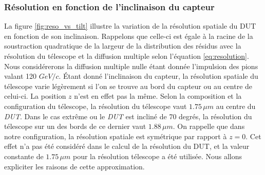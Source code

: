 
   \subsubsection{R\'esolution en fonction de l'inclinaison du capteur}
   
   La figure \ref{fig:reso_vs_tilt} illustre la variation de la r\'esolution spatiale du DUT en fonction de son inclinaison. Rappelons que celle-ci est \'egale \`a la racine de la soustraction quadratique de la largeur de la distribution des r\'esidus avec la r\'esolution du t\'elescope et la diffusion multiple selon l'\'equation \ref{eq:resolution}. Nous considérerons la diffusion multiple nulle \'etant donn\'ee l'impulsion des pions valant 120 $GeV/c$. Étant donn\'e l'inclinaison du capteur, la r\'esolution spatiale du t\'elescope varie l\'eg\`erement si l'on se trouve au bord du capteur ou au centre de celui-ci. La position $z$ n'est en effet pas la m\^eme. Selon la composition et la configuration du t\'elescope, la r\'esolution du t\'elescope vaut $1.75 \, \mu m$ au centre du \textit{DUT}. Dans le cas extr\^eme ou le \textit{DUT} est inclin\'e de 70 degr\'es, la r\'esolution du t\'elescope sur un des bords de ce dernier vaut $1.88 \, \mu m$. On rappelle que dans notre configuration, la r\'esolution spatiale est sym\'etrique par rapport \`a $z=0$. Cet effet n'a pas \'et\'e consid\'er\'e dans le calcul de la r\'esolution du DUT, et la valeur constante de $1.75 \, \mu m$ pour la r\'esolution t\'elescope a \'et\'e utilis\'ee. Nous allons expliciter les raisons de cette approximation.
   
